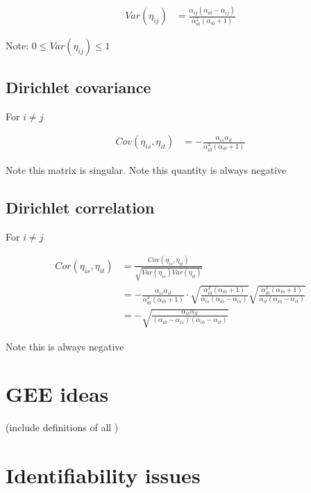 \documentclass[10pt]{article}
\theoremstyle{definition}
\begin{document}
\begin{align*}
  Var(\eta_{ij}) &= \frac{\alpha_{ij}(\alpha_{i0} - \alpha_{ij})}{\alpha_{i0}^2(\alpha_{i0} + 1)}
\end{align*}

Note: $0 \leq Var(\eta_{ij}) \leq 1$

\subsection{Dirichlet covariance }

For $i \neq j$

\begin{align*}
  Cov(\eta_{is}, \eta_{it}) &=  - \frac{\alpha_{is}\alpha_{it}}{\alpha_{i0}^2(\alpha_{i0} + 1)}
\end{align*}


Note this matrix is singular.
Note this quantity is always negative

\subsection{Dirichlet correlation }

For $i \neq j$

\begin{align*}
  Cor(\eta_{is}, \eta_{it}) &= \frac{Cov(\eta_{is}, \eta_{it})}{\sqrt{Var(\eta_{is})Var(\eta_{it})}}\\
  &= -  \frac{\alpha_{is}\alpha_{it}}{\alpha_{i0}^2(\alpha_{i0} + 1)} \cdot \sqrt{\frac{\alpha_{i0}^2(\alpha_{i0} + 1)}{\alpha_{is}(\alpha_{i0} - \alpha_{is})}}\sqrt{\frac{\alpha_{i0}^2(\alpha_{i0} + 1)}{\alpha_{it}(\alpha_{i0} - \alpha_{it})}}\\
  &= - \sqrt{\frac{\alpha_{is}\alpha_{it}}{(\alpha_{i0} - \alpha_{is})(\alpha_{i0} - \alpha_{it})}}
\end{align*}


Note this is always negative

\section{GEE ideas}




(include definitions of all )

\section{Identifiability issues}
\end{document}

